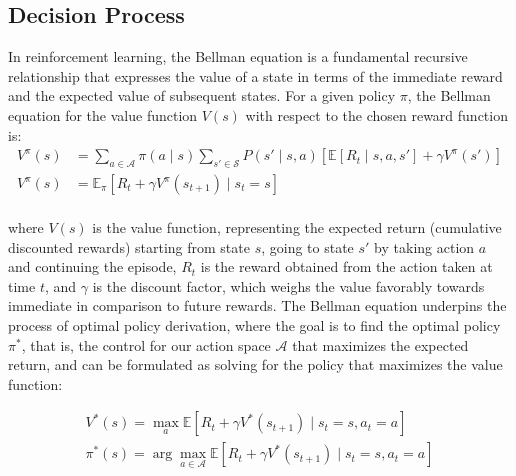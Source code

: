 \subsection{Decision Process}
\label{subsec:decision-process}

In reinforcement learning, the Bellman equation is a fundamental recursive relationship that expresses the value of a
state in terms of the immediate reward and the expected value of subsequent states.
For a given policy $\pi$, the Bellman equation for the value function $V(s)$ with respect to the chosen reward function is:
\begin{equation*}
    \begin{aligned}
        V^\pi(s) &= \sum_{a \in \mathcal{A}} \pi(a \mid s) \sum_{s' \in \mathcal{S}} P(s' \mid s, a) \left[ \mathbb{E}[R_t \mid s, a, s'] + \gamma V^\pi(s') \right]\\
        V^\pi(s) &= \mathbb{E}_\pi \left[ R_t + \gamma V^\pi(s_{t+1}) \mid s_t = s \right]\\
    \end{aligned}
\end{equation*}

where $V(s)$ is the value function, representing the expected return (cumulative discounted rewards) starting from state $s$,
going to state $s'$ by taking action $a$ and continuing the episode, $R_t$ is the reward obtained from the action taken at time $t$,
and $\gamma$ is the discount factor, which weighs the value favorably towards immediate in comparison to future rewards.
The Bellman equation underpins the process of optimal policy derivation, where the goal is to find the optimal policy $\pi^*$,
that is, the control for our action space $\mathcal{A}$ that maximizes the expected return,
and can be formulated as solving for the policy that maximizes the value function:

\begin{gather*}
    V^*(s) = \max_a \mathbb{E} \left[ R_t + \gamma V^*(s_{t+1}) \mid s_t = s, a_t = a \right]\\
    \pi^*(s) = \arg \max_{a \in \mathcal{A}} \mathbb{E} \left[ R_t + \gamma V^*(s_{t+1}) \mid s_t = s, a_t = a \right]\\
\end{gather*}

